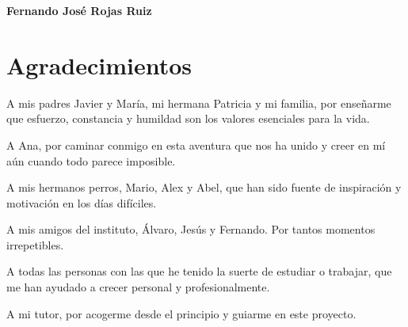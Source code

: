 \noindent \textbf{Fernando José Rojas Ruiz}

\chapter*{Agradecimientos}
\thispagestyle{empty}

       \vspace{1cm}

A mis padres Javier y María, mi hermana Patricia y mi familia, por enseñarme que esfuerzo, constancia y humildad son los valores esenciales para la vida.

\vspace{0.5cm}

A Ana, por caminar conmigo en esta aventura que nos ha unido y creer en mí aún cuando todo parece imposible.

\vspace{0.5cm}

A mis hermanos perros, Mario, Alex y Abel, que han sido fuente de inspiración y motivación en los días difíciles.

\vspace{0.5cm}

A mis amigos del instituto, Álvaro, Jesús y Fernando. Por tantos momentos irrepetibles.

\vspace{0.5cm}

A todas las personas con las que he tenido la suerte de estudiar o trabajar, que me han ayudado a crecer personal y profesionalmente.

\vspace{0.5cm}

A mi tutor, por acogerme desde el principio y guiarme en este proyecto.
